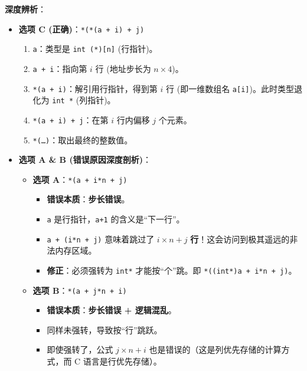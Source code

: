 \documentclass[a4paper,12pt]{article}
\begin{document}
\textbf{深度辨析}：
\begin{itemize}
    \item \textbf{选项 C (正确)}：\texttt{*(*(a + i) + j)}
    \begin{enumerate}
        \item \texttt{a}：类型是 \texttt{int (*)[n]} (行指针)。
        \item \texttt{a + i}：指向第 $i$ 行 (地址步长为 $n \times 4$)。
        \item \texttt{*(a + i)}：解引用行指针，得到第 $i$ 行 (即一维数组名 \texttt{a[i]})。此时类型退化为 \texttt{int *} (列指针)。
        \item \texttt{*(a + i) + j}：在第 $i$ 行内偏移 $j$ 个元素。
        \item \texttt{*(\dots)}：取出最终的整数值。
    \end{enumerate}
    
    \item \textbf{选项 A \& B (错误原因深度剖析)}：
    \begin{itemize}
        \item \textbf{选项 A}：\texttt{*(a + i*n + j)}
        \begin{itemize}
            \item \textbf{错误本质}：\textbf{步长错误}。
            \item \texttt{a} 是行指针，\texttt{a+1} 的含义是“下一行”。
            \item \texttt{a + (i*n + j)} 意味着跳过了 $i \times n + j$ \textbf{行}！这会访问到极其遥远的非法内存区域。
            \item \textbf{修正}：必须强转为 \texttt{int*} 才能按“个”跳。即 \texttt{*((int*)a + i*n + j)}。
        \end{itemize}
        \item \textbf{选项 B}：\texttt{*(a + j*n + i)}
        \begin{itemize}
            \item \textbf{错误本质}：\textbf{步长错误 + 逻辑混乱}。
            \item 同样未强转，导致按“行”跳跃。
            \item 即使强转了，公式 $j \times n + i$ 也是错误的（这是列优先存储的计算方式，而 C 语言是行优先存储）。
        \end{itemize}
    \end{itemize}
\end{itemize}
\end{document}
